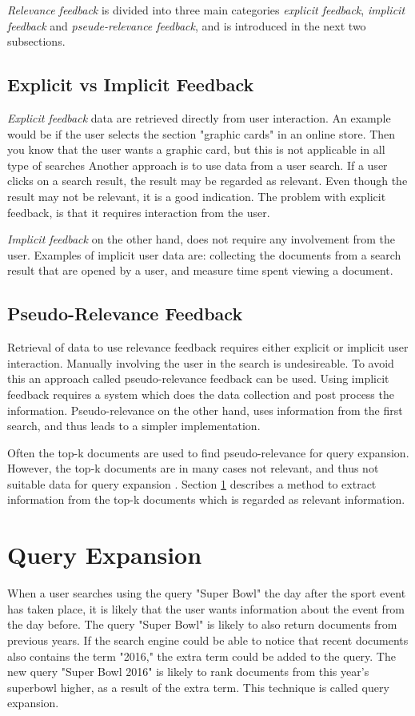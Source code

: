 \textit{Relevance feedback} is divided into three main categories \textit{explicit feedback}, \textit{implicit feedback} and \textit{pseude-relevance feedback},
and is introduced in the next two subsections.

\subsection{Explicit vs Implicit Feedback}
\textit{Explicit feedback} data are retrieved directly from user interaction.
An example would be if the user selects the section "graphic cards" in an online store.
Then you know that the user wants a graphic card, but this is not applicable in all type of searches
Another approach is to use data from a user search.
If a user clicks on a search result, the result may be regarded as relevant.
Even though the result may not be relevant, it is a good indication.
The problem with explicit feedback, is that it requires interaction from the user.

\textit{Implicit feedback} on the other hand, does not require any involvement from the user.
Examples of implicit user data are:
collecting the documents from a search result that  are opened by a user,
and measure time spent viewing a document.

\subsection{Pseudo-Relevance Feedback}
Retrieval of data to use relevance feedback requires either explicit or implicit user interaction.
Manually involving the user in the search is undesireable.
To avoid this an approach called pseudo-relevance feedback can be used.
Using implicit feedback requires a system which does the data collection and post process the information.
Pseudo-relevance on the other hand, uses information from the first search, and thus leads to a simpler implementation.

Often the top-k documents are used to find pseudo-relevance for query expansion.
However, the top-k documents are in many cases not relevant, and thus not suitable data for query expansion \cite{pseudo-relevance-invalid}.
Section \ref{sec:query-expansion} describes a method to extract information from the top-k documents which is regarded as relevant information.

\section{Query Expansion}
\label{sec:query-expansion}
When a user searches using the query "Super Bowl" the day after the sport event has taken place,
it is likely that the user wants information about the event from the day before.
The query "Super Bowl" is likely to also return documents from previous years.
If the search engine could be able to notice that recent documents also contains the term "2016,"
the extra term could be added to the query.
The new query "Super Bowl 2016" is likely to rank documents from this year's superbowl higher, as a result of the extra term.
This technique is called query expansion.

